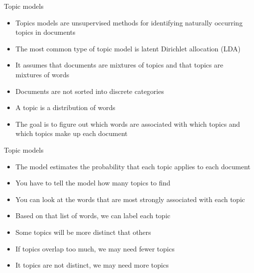 \documentclass[pdf, 9pt, fleqn, handout]{beamer}
\begin{document}
\begin{frame}{Topic models}
\begin{itemize}
\item Topics models are unsupervised methods for identifying naturally occurring topics in documents \\[1em]
\item The most common type of topic model is latent Dirichlet allocation (LDA) \\[1em]
\item It assumes that documents are mixtures of topics and that topics are mixtures of words \\[1em]
\item Documents are not sorted into discrete categories \\[1em]
\item A topic is a distribution of words \\[1em]
\item The goal is to figure out which words are associated with which topics and which topics make up each document
\end{itemize}
\end{frame}

\begin{frame}{Topic models}
\begin{itemize}
\item The model estimates the probability that each topic applies to each document \\[1em]
\item You have to tell the model how many topics to find \\[1em]
\item You can look at the words that are most strongly associated with each topic \\[1em]
\item Based on that list of words, we can label each topic \\[1em]
\item Some topics will be more distinct that others \\[1em]
\item If topics overlap too much, we may need fewer topics \\[1em]
\item It topics are not distinct, we may need more topics
\end{itemize}
\end{frame}
\end{document}
